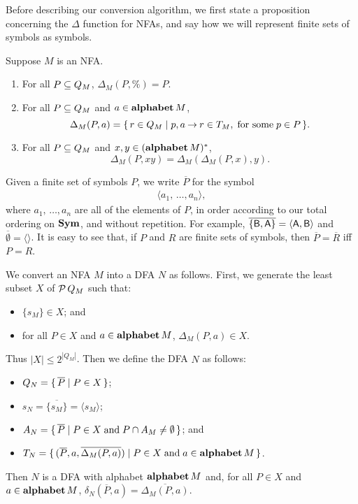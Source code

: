 Before describing our conversion algorithm, we first state a
proposition concerning the $\Delta$ function for NFAs, and say how we
will represent finite sets of symbols as symbols.

\begin{proposition}
\label{NFADeltaProp}
Suppose $M$ is an NFA.
\begin{enumerate}[\quad(1)]
\item For all $P\subseteq Q_M$, $\Delta_M(P,\%)=P$.

\item For all $P\subseteq Q_M$ and $a\in\mathbf{alphabet}\,M$,
  \begin{displaymath}
    \Delta_M(P,a)=\{ \, r\in Q_M \mid p,a\mathbin{\to} r\in T_M,\;\allowbreak\mbox{for some}\allowbreak\;p\in P \, \}.
  \end{displaymath}

\item For all $P\subseteq Q_M$ and $x,y\in(\mathbf{alphabet}\,M)^*$,
  \begin{displaymath}
    \Delta_M(P, xy)=\Delta_M(\Delta_M(P,x),y) .
  \end{displaymath}
\end{enumerate}
\end{proposition}

Given a finite set of symbols $P$, we write $\overline{P}$ for
the symbol
\begin{gather*}
\langle a_1,\,\ldots,a_n\rangle,
\end{gather*}
where $a_1,\,\ldots,a_n$ are all of the elements of $P$, in order
according to our total ordering on $\mathbf{Sym}$, and without repetition.  For
example, $\overline{\{\mathsf{B},\mathsf{A}\}}=\langle\mathsf{A},\mathsf{B}\rangle$ and
$\overline{\emptyset}=\langle\rangle$.
It is easy to see that, if $P$ and $R$ are finite sets of symbols, then
$\overline{P}=\overline{R}$ iff $P=R$.

We convert an NFA $M$ into a DFA $N$ as follows.  First,
we generate the least subset $X$ of ${\cal P} \,Q_M$ such that:
\begin{itemize}
\item $\{s_M\}\in X$; and

\item for all $P\in X$ and $a\in\mathbf{alphabet}\,M$,
$\Delta_M(P,a)\in X$.
\end{itemize}
Thus $|X|\leq 2^{|Q_M|}$.  Then we define the DFA $N$ as follows:
\begin{itemize}
\item $Q_N=\{ \, \overline{P} \mid P\in X \, \}$;

\item $s_N=\overline{\{s_M\}}=\langle s_M\rangle$;

\item $A_N=\{ \, \overline{P} \mid P\in X\;\allowbreak\mbox{and}\allowbreak\;P\cap A_M\neq\emptyset \, \}$;
  and

\item $T_N=\{ \, (\overline{P},a,
\overline{\Delta_M(P,a)}) \mid P\in X\;\allowbreak\mbox{and}\allowbreak\;a\in\mathbf{alphabet}\,M \, \}$.
\end{itemize}
Then $N$ is a DFA with alphabet $\mathbf{alphabet}\,M$ and, for all $P\in X$ and
$a\in\mathbf{alphabet}\,M$, $\delta_N(\overline{P},a)=\overline{\Delta_M(P,a)}$.

